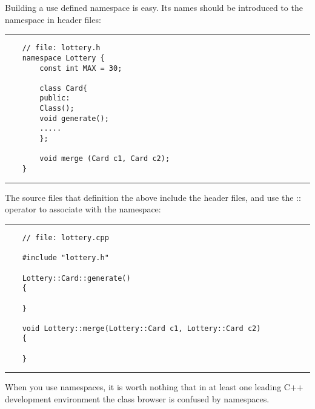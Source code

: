 	Building a use defined namespace is easy. Its names should be introduced to the namespace in header files:
	
	\noindent\vspace{1em}\hrule
	\begin{verbatim}
	// file: lottery.h
	namespace Lottery {
	    const int MAX = 30;
	
	    class Card{
	    public:
	    Class();
	    void generate();
	    .....
	    };
	
	    void merge (Card c1, Card c2);
	}
	\end{verbatim}
	\noindent\hrule\vspace{1em}
	
	The source files that definition the above include the header files, and use the :: operator to associate with the namespace:
	
	\noindent\vspace{1em}\hrule
	\begin{verbatim}
	// file: lottery.cpp
	
	#include "lottery.h"
	
	Lottery::Card::generate()
	{
	    
	}
	
	void Lottery::merge(Lottery::Card c1, Lottery::Card c2)
	{
	    
	}
	\end{verbatim}
	\noindent\vspace{1em}\hrule
	
	When you use namespaces, it is worth nothing that in at least one leading C++ development environment the class browser is confused by namespaces.
	
